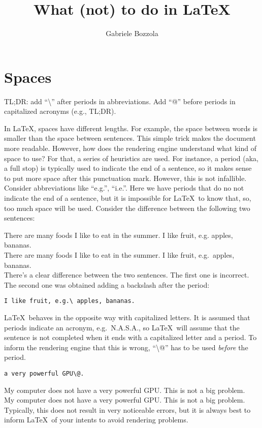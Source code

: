\documentclass[]{article}
\author{Gabriele Bozzola}
\title{What (not) to do in \LaTeX}
\date{}
\begin{document}
\maketitle
\tableofcontents

\section{Spaces}%
\label{sec:spaces}

TL;DR\@: add ``\textbackslash'' after periods in abbreviations. Add ``@'' before
periods in capitalized acronyms (e.g., TL;DR).

In \LaTeX, spaces have different lengths. For example, the space between words
is smaller than the space between sentences. This simple trick makes the
document more readable. However, how does the rendering engine understand what
kind of space to use? For that, a series of heuristics are used. For instance, a
period (aka, a full stop) is typically used to indicate the end of a sentence,
so it makes sense to put more space after this punctuation mark. However, this
is not infallible. Consider abbreviations like ``e.g.'', ``i.e.''. Here we have
periods that do no not indicate the end of a sentence, but it is impossible for
\LaTeX~to know that, so, too much space will be used. Consider the difference
between the following two sentences:

\noindent
There are many foods I like to eat in the summer. I like fruit, e.g. apples, bananas.\\
There are many foods I like to eat in the summer. I like fruit, e.g.\ apples, bananas.\\

There's a clear difference between the two sentences. The first one is incorrect.
The second one was obtained adding a backslash after the period:
\begin{verbatim}
I like fruit, e.g.\ apples, bananas.
\end{verbatim}

\LaTeX~behaves in the opposite way with capitalized letters. It is assumed that
periods indicate an acronym, e.g.~N.A.S.A., so \LaTeX~will assume that the
sentence is not completed when it ends with a capitalized letter and a period.
To inform the rendering engine that this is wrong, ``\textbackslash @'' has to
be used \emph{before} the period.

\begin{verbatim}
a very powerful GPU\@.
\end{verbatim}

\noindent
My computer does not have a very powerful GPU. This is not a big problem.\\
My computer does not have a very powerful GPU\@. This is not a big problem.\\

Typically, this does not result in very noticeable errors, but it is always
best to inform \LaTeX~of your intents to avoid rendering problems.
\end{document}
